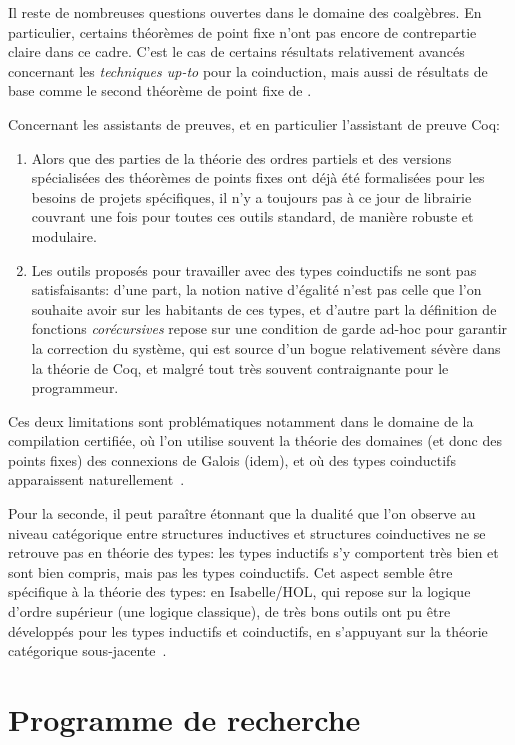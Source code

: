 \documentclass[a4paper,11pt]{article}
\begin{document}
Il reste de nombreuses questions ouvertes dans le domaine des coalgèbres. En particulier, 
certains théorèmes de point fixe n'ont pas encore de contrepartie claire dans ce cadre.
C'est le cas de certains résultats relativement avancés concernant les \emph{techniques up-to} pour la coinduction\cite{pous:lics16:cawu,pr19:lmcs:companion}, mais aussi de résultats de base comme le second théorème de point fixe de \cite[chapitre~8]{DaveyPriestley90}. 

Concernant les assistants de preuves, et en particulier l'assistant de preuve Coq:
\begin{enumerate}
\item Alors que des parties de la théorie des ordres partiels et des versions spécialisées des théorèmes de points fixes ont déjà été formalisées pour les besoins de projets spécifiques, il n'y a toujours pas à ce jour de librairie couvrant une fois pour toutes ces outils standard, de manière robuste et modulaire.
\item Les outils proposés pour travailler avec des types coinductifs ne sont pas satisfaisants: d'une part, la notion native d'égalité n'est pas celle que l'on souhaite avoir sur les habitants de ces types, et d'autre part la définition de fonctions \emph{corécursives} repose sur une condition de garde ad-hoc pour garantir la correction du système, qui est source d'un bogue relativement sévère dans la théorie de Coq, et malgré tout très souvent contraignante pour le programmeur.
\end{enumerate}
Ces deux limitations sont problématiques notamment dans le domaine de la compilation certifiée, où l'on utilise souvent la théorie des domaines (et donc des points fixes) des connexions de Galois (idem), et où des types coinductifs apparaissent naturellement~\cite{compcert,itrees}.

Pour la seconde, il peut paraître étonnant que la dualité que l'on observe au niveau catégorique entre structures inductives et structures coinductives ne se retrouve pas en théorie des types: les types inductifs s'y comportent très bien et sont bien compris, mais pas les types coinductifs.
Cet aspect semble être spécifique à la théorie des types: en Isabelle/HOL, qui repose sur la logique  d'ordre supérieur (une logique classique), de très bons outils ont pu être développés pour les types inductifs et coinductifs, en s'appuyant sur la théorie catégorique sous-jacente~\cite{DBLP:conf/frocos/BiendarraBBDFHK17}.

\section{Programme de recherche}
\end{document}
